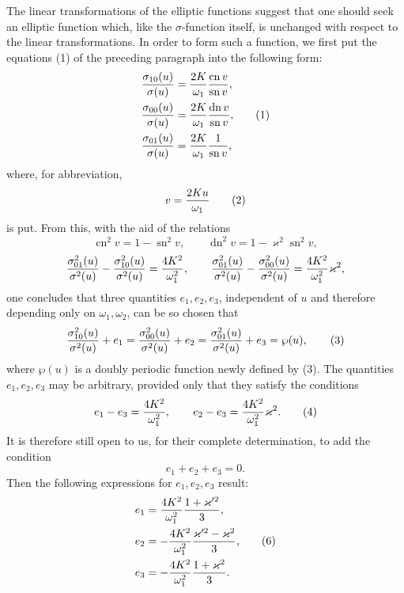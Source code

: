 \documentclass[11pt]{article}
\providecommand{\sn}{\operatorname{sn}}
\providecommand{\cn}{\operatorname{cn}}
\providecommand{\dn}{\operatorname{dn}}
\begin{document}
The linear transformations of the elliptic functions suggest that one should seek an elliptic function which, like the $\sigma$-function itself, is unchanged with respect to the linear transformations. In order to form such a function, we first put the equations (1) of the preceding paragraph into the following form:
\begin{equation}
\begin{aligned}
{\sigma_{10}(u)\over\sigma(u)}&={2K\over\omega_1}{\cn v\over\sn v},\\
{\sigma_{00}(u)\over\sigma(u)}&={2K\over\omega_1}{\dn v\over\sn v},\\
{\sigma_{01}(u)\over\sigma(u)}&={2K\over\omega_1}{1\over\sn v},
\end{aligned}
\tag{1}
\end{equation}
where, for abbreviation,
\begin{equation}
 v={2Ku\over\omega_1}
\tag{2}
\end{equation}
is put. From this, with the aid of the relations
\[
\cn^2v=1-\sn^2v,
\qquad
\dn^2v=1-\varkappa^2\sn^2v,
\]
\[
{\sigma_{01}^2(u)\over\sigma^2(u)}-{\sigma_{10}^2(u)\over\sigma^2(u)}={4K^2\over\omega_1^2},
\qquad
{\sigma_{01}^2(u)\over\sigma^2(u)}-{\sigma_{00}^2(u)\over\sigma^2(u)}={4K^2\over\omega_1^2}\varkappa^2,
\]
one concludes that three quantities $e_1,e_2,e_3$, independent of $u$ and therefore depending only on $\omega_1,\omega_2$, can be so chosen that
\begin{equation}
{\sigma_{10}^2(u)\over\sigma^2(u)}+e_1
={\sigma_{00}^2(u)\over\sigma^2(u)}+e_2
={\sigma_{01}^2(u)\over\sigma^2(u)}+e_3
=\wp(u),
\tag{3}
\end{equation}
where $\wp(u)$ is a doubly periodic function newly defined by (3). The quantities $e_1,e_2,e_3$ may be arbitrary, provided only that they satisfy the conditions
\begin{equation}
 e_1-e_3={4K^2\over\omega_1^2},
 \qquad
 e_2-e_3={4K^2\over\omega_1^2}\varkappa^2.
\tag{4}
\end{equation}
It is therefore still open to us, for their complete determination, to add the condition
\begin{equation}
 e_1+e_2+e_3=0.
\tag{5}
\end{equation}
Then the following expressions for $e_1,e_2,e_3$ result:
\begin{equation}
\begin{aligned}
e_1&={4K^2\over\omega_1^2}{1+\varkappa'^2\over3},\\
e_2&=-{4K^2\over\omega_1^2}{\varkappa'^2-\varkappa^2\over3},\\
e_3&=-{4K^2\over\omega_1^2}{1+\varkappa^2\over3}.
\end{aligned}
\tag{6}
\end{equation}
\end{document}
